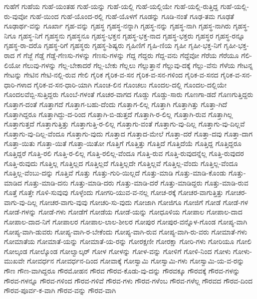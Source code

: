 {ಗುಹೆಗೆ
ಗುಹೆಯ
ಗುಹೆ-ಯಂತಹ
ಗುಹೆ-ಯನ್ನು
ಗುಹೆ-ಯಲ್ಲಿ
ಗುಹೆ-ಯಲ್ಲಿಯೇ
ಗುಹೆ-ಯಲ್ಲಿ-ರುತ್ತಿದ್ದ
ಗುಹೆ-ಯಲ್ಲಿ-ರು-ವುವೋ
ಗುಹೆ-ಯಿಂದ
ಗುಹೆ-ಯೊಂದ-ರಲ್ಲಿ
ಗುಹೆ-ಯೊಳಗೆ
ಗೂಡನ್ನು
ಗೂಡಿ-ನಂತೆ
ಗೂಢ-ತಮ
ಗೂಢತೆ
ಗೂಢಾರ್ಥ-ವನ್ನು
ಗೂರ್ಖಾ
ಗೃಹ-ವನ್ನು
ಗೃಹಸ್ಥ
ಗೃಹಸ್ಥ-ನನ್ನಾಗಿ
ಗೃಹಸ್ಥ-ನನ್ನು
ಗೃಹಸ್ಥ-ನಾಗಿ
ಗೃಹಸ್ಥ-ನಾಗಿರು
ಗೃಹಸ್ಥ-ನಿಗೂ
ಗೃಹಸ್ಥ-ನಿಗೆ
ಗೃಹಸ್ಥನು
ಗೃಹಸ್ಥನೂ
ಗೃಹಸ್ಥ-ಭಕ್ತನ
ಗೃಹಸ್ಥ-ಭಕ್ತ-ನಾದ
ಗೃಹಸ್ಥ-ಭಕ್ತರು
ಗೃಹಸ್ಥರ
ಗೃಹಸ್ಥ-ರನ್ನೂ
ಗೃಹಸ್ಥ-ರಾ-ದರೊ
ಗೃಹಸ್ಥ-ರಿಗೆ
ಗೃಹಸ್ಥರು
ಗೃಹಸ್ಥ-ಶಿಷ್ಯರು
ಗೃಹಿಣಿಗೆ
ಗೃಹಿ-ಣಿಯ
ಗೃಹೀ
ಗೃಹೀ-ಭಕ್ತ-ನಿಗೆ
ಗೃಹೀ-ಭಕ್ತ-ರಾದ
ಗೆ
ಗೆಜ್ಜೆ
ಗೆಡ್ಡೆ
ಗೆಡ್ಡೆ-ಗೆಣಸು-ಗಳನ್ನು
ಗೆಣಸು-ಗಳನ್ನು
ಗೆದ್ದ
ಗೆದ್ದರು
ಗೆದ್ದ-ವನು
ಗೆದ್ದೆವೋ
ಗೆರೆಯ
ಗೆರೆಯೂ
ಗೆಲಿ-ಲಿಯೋ
ಗೆಲುವು-ಗಳನ್ನು
ಗೆಲ್ಲ-ಬೇಕಾದರೆ
ಗೆಲ್ಲ-ಬೇಕು
ಗೆಲ್ಲಲು
ಗೆಲ್ಲುತ್ತಾನೆ
ಗೆಲ್ಲುವು-ದಕ್ಕೆ
ಗೆಲ್ಲು-ವೆನು
ಗೆಳೆಯ
ಗೇಟನ್ನ
ಗೇಟನ್ನು
ಗೇಟಿನ
ಗೇಟಿ-ನಲ್ಲಿ-ರುವ
ಗೇಲಿ
ಗೈರಿಕ
ಗೈರಿಕ-ವ-ಸನ
ಗೈರಿಕ-ವ-ಸನ-ಗಳಿಂದ
ಗೈರಿಕ-ವ-ಸನದ
ಗೈರಿಕ-ವ-ಸನ-ಧಾರಿ-ಗಳಾದ
ಗೈರಿಕ-ವ-ಸನ-ಧಾರಿ-ಯಾಗಿ
ಗೊಂಚ-ಲಿನ
ಗೊಂಚಲು
ಗೊಂದಲ-ದಲ್ಲಿ
ಗೊಂದಲ-ದಲ್ಲಿಯೇ
ಗೊಂದಲವೆಬ್ಬಿ-ಸುತ್ತಿದ್ದರು
ಗೊಂಬೆ-ಗಳಂತೆ
ಗೊಚರ-ವಾಗದ
ಗೊಡ್ಡು
ಗೊಡ್ಡು-ಸಾರು
ಗೊಣಗಾ-ಡದೆ
ಗೊಣಗುತ್ತಿದ್ದರು
ಗೊತ್ತಾಗ-ದಂತೆ
ಗೊತ್ತಾಗದೆ
ಗೊತ್ತಾಗ-ಬಹು-ದೆಂದು
ಗೊತ್ತಾಗ-ಲಿಲ್ಲ
ಗೊತ್ತಾಗಿ
ಗೊತ್ತಾಗಿತ್ತು
ಗೊತ್ತಾ-ಗಿದೆ
ಗೊತ್ತಾಗಿದ್ದರೂ
ಗೊತ್ತಾಗಿದ್ದು-ದ-ರಿಂದ
ಗೊತ್ತಾಗಿ-ಬಿ-ಡುತ್ತದೆ
ಗೊತ್ತಾಗಿ-ರ-ಲಿಲ್ಲ
ಗೊತ್ತಾಗಿ-ರುವ
ಗೊತ್ತಾಗಿಲ್ಲ
ಗೊತ್ತಾಗುತ್ತದೆ
ಗೊತ್ತಾಗುತ್ತಿತ್ತು
ಗೊತ್ತಾಗುತ್ತಿ-ರ-ಲಿಲ್ಲ
ಗೊತ್ತಾಗು-ವಂತೆ
ಗೊತ್ತಾಗು-ವು-ದಿಲ್ಲ
ಗೊತ್ತಾಗು-ವು-ದಿಲ್ಲವೆ
ಗೊತ್ತಾಗು-ವು-ದಿಲ್ಲ-ವೆಂದೂ
ಗೊತ್ತಾಗು-ವುದು
ಗೊತ್ತಾದ
ಗೊತ್ತಾದ-ಮೇಲೆ
ಗೊತ್ತಾ-ದರೆ
ಗೊತ್ತಾ-ದವು
ಗೊತ್ತಾ-ದಾಗ
ಗೊತ್ತಾ-ಯಿತು
ಗೊತ್ತಾ-ಯಿತೆ
ಗೊತ್ತಾ-ಯಿತೋ
ಗೊತ್ತಿಗೆ
ಗೊತ್ತಿತ್ತು
ಗೊತ್ತಿದೆ
ಗೊತ್ತಿದೆಯೆ
ಗೊತ್ತಿದ್ದ
ಗೊತ್ತಿದ್ದರೂ
ಗೊತ್ತಿದ್ದರೆ
ಗೊತ್ತಿ-ರಲಿ
ಗೊತ್ತಿ-ರ-ಲಿಲ್ಲ
ಗೊತ್ತಿ-ರಲಿಲ್ಲ-ವೆಂದೂ
ಗೊತ್ತಿ-ರುವ
ಗೊತ್ತಿ-ರುವುದನ್ನೆಲ್ಲ
ಗೊತ್ತಿ-ರುವುದರ
ಗೊತ್ತಿ-ರುವುದು
ಗೊತ್ತಿಲ್ಲ
ಗೊತ್ತಿಲ್ಲದ
ಗೊತ್ತಿಲ್ಲದೆ
ಗೊತ್ತಿಲ್ಲದೇ
ಗೊತ್ತಿಲ್ಲವೆ
ಗೊತ್ತಿಲ್ಲ-ವೆಂದು
ಗೊತ್ತಿಲ್ಲ-ವೆಂದೂ
ಗೊತ್ತಿಲ್ಲ-ವೆಂಬು-ದನ್ನು
ಗೊತ್ತಿವೆ
ಗೊತ್ತು
ಗೊತ್ತು-ಗುರಿ-ಯಿಲ್ಲದೆ
ಗೊತ್ತು-ಮಾಡಿ
ಗೊತ್ತು-ಮಾಡಿ-ಕೊಂಡು
ಗೊತ್ತು-ಮಾಡಿದ
ಗೊತ್ತು-ಮಾಡಿ-ದನು
ಗೊತ್ತು-ಮಾಡಿ-ದರು
ಗೊತ್ತು-ಮಾಡಿ-ದರೆ
ಗೊತ್ತು-ಮಾಡಿದ್ದರು
ಗೊತ್ತು-ಮಾಡಿ-ರುವ
ಗೊತ್ತೆ
ಗೊತ್ತೇ
ಗೊಳಿ-ಸುವುವು
ಗೊಳ್ಳೆಂದು
ಗೋಗರಿ-ಯುವ-ವ-ನಲ್ಲ
ಗೋಚ-ರಕ್ಕೆ
ಗೋಚರ-ವಾಗುತ್ತಿತ್ತು
ಗೋಚರ-ವಾಗು-ವು-ದಿಲ್ಲ
ಗೋಚರ-ವಾಗು-ವುವು
ಗೋಚರಿ-ಸು-ವುದು
ಗೋಜಾಗಿ
ಗೋಜಿಗೂ
ಗೋಜಿಗೆ
ಗೋಡೆ
ಗೋಡೆ-ಗಳ
ಗೋಡೆ-ಗಳನ್ನು
ಗೋಡೆ-ಗಳು
ಗೋಡೆಗೆ
ಗೋಡೆಯ
ಗೋಡೆ-ಯನ್ನು
ಗೋಧೂಳಿಯ
ಗೋಪಾಲ
ಗೋಪಾಲ-ದಾದ
ಗೋಪಾಲ-ದಾದ-ನಿಗೆ
ಗೋಪಾಲರ
ಗೋಪಾಲ-ಲಾಲ-ಶೀಲರ
ಗೋಪುರ
ಗೋಪುರ-ವನ್ನೊಳ-ಗೊಂಡ
ಗೋಪ್ಯ-ವಾಗಿ
ಗೋಪ್ಯ-ವಾಗಿ-ಡುವರು
ಗೋಪ್ಯ-ವಾಗಿ-ರ-ಬೇಕೆಂದು
ಗೋಪ್ಯ-ವಾಗಿ-ರುವ
ಗೋಪ್ಯ-ವಾಗಿ-ರು-ವರು
ಗೋಮಾತೆ-ಗಳು
ಗೋಮಾತೆಯ
ಗೋಮಾತೆ-ಯನ್ನು
ಗೋಮಾತೆ-ಯ-ರನ್ನು
ಗೋರಕ್ಷಣೀ
ಗೋರಕ್ಷಾ
ಗೋರಿ-ಗಳು
ಗೋರಿಯೂ
ಗೋಲಿ
ಗೋಲ್ಕಂಡ
ಗೋಲ್ಕೊಂಡ
ಗೋಲ್ವಾಲ್ಕರ್
ಗೋಳ
ಗೋಳನ್ನು
ಗೋಳ-ವನ್ನು
ಗೋಳಿಗೆ
ಗೋಳಿ-ನಿಂದ
ಗೋಳು
ಗೋಳು-ಮುಖವೇ
ಗೋವರ್ಧನ
ಗೋವರ್ಧನ-ದಿಂದ
ಗೋವಾಕ್ಕೆ
ಗೋಸ್ವಾಮಿ
ಗೋಸ್ವಾಮಿ-ಗಳು
ಗೋಸ್ವಾಮಿ-ಯ-ವ-ರನ್ನು
ಗೌಣ
ಗೌಣ-ವಾಗಿದ್ದರೂ
ಗೌರಮೋಹನ
ಗೌರವ
ಗೌರವ-ಕೊಡು-ವು-ದನ್ನು
ಗೌರವಕ್ಕೂ
ಗೌರವಕ್ಕೆ
ಗೌರವ-ಗಳನ್ನು
ಗೌರವ-ಗಳನ್ನೂ
ಗೌರವ-ಗಳಿಂದ
ಗೌರವ-ಗಳಿವೆ
ಗೌರವ-ಗಳು
ಗೌರವ-ಗಳೆಂಬ
ಗೌರವ-ಗಳೆಲ್ಲ
ಗೌರವದ
ಗೌರವ-ದಿಂದ
ಗೌರವ-ಪೂರ್ವ-ಕ-ವಾಗಿ
ಗೌರವ-ವನ್ನು
ಗೌರವ-ವಾಗಿ
}
